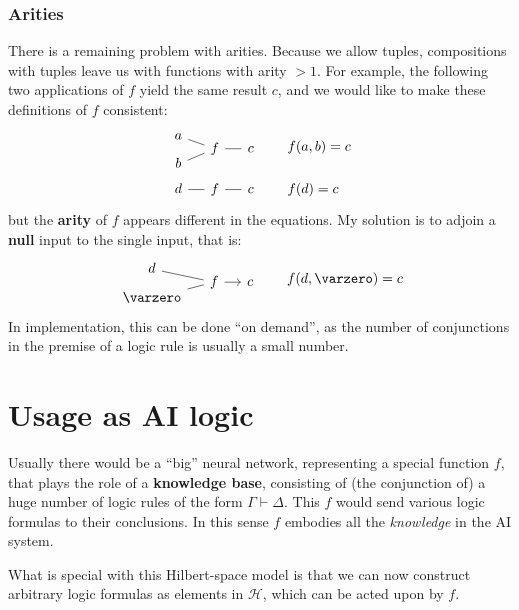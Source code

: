 \subsubsection*{Arities}

There is a remaining problem with arities.  Because we allow tuples, compositions with tuples leave us with functions with arity $> 1$.  For example, the following two applications of $f$ yield the same result $c$, and we would like to make these definitions of $f$ consistent:
\begin{eqnarray}
\begin{tikzcd}[column sep=small, row sep=-0.5em]
a \arrow[-, dr] & & \\
& f \arrow[-, r] & c\\
b \arrow[-, ur] & &
\end{tikzcd} 
& \qquad f(a,b) = c \\
\begin{tikzcd}[column sep=small]
d \arrow[-, r] & f \arrow[-, r] & c
\end{tikzcd} 
& \qquad f(d) = c
\nonumber 
\end{eqnarray}
but the \textbf{arity} of $f$ appears different in the equations.  My solution is to adjoin a \textbf{null} input to the single input, that is:
\begin{equation}
\begin{tikzcd}[column sep=small, row sep=-0.5em]
d \arrow[-, dr] & & \\
& f \arrow[r] & c\\
\varzero \arrow[-, ur] & &
\end{tikzcd}
\qquad f(d, \varzero) = c
\end{equation}
In implementation, this can be done ``on demand'', as the number of conjunctions in the premise of a logic rule is usually a small number.

\section{Usage as AI logic}

Usually there would be a ``big'' neural network, representing a special function $f$, that plays the role of a \textbf{knowledge base}, consisting of (the conjunction of) a huge number of logic rules of the form $\Gamma \vdash \Delta$.  This $f$ would send various logic formulas to their conclusions.  In this sense $f$ embodies all the \textit{knowledge} in the AI system.

What is special with this Hilbert-space model is that we can now construct arbitrary logic formulas as elements in $\mathcal{H}$, which can be acted upon by $f$.

